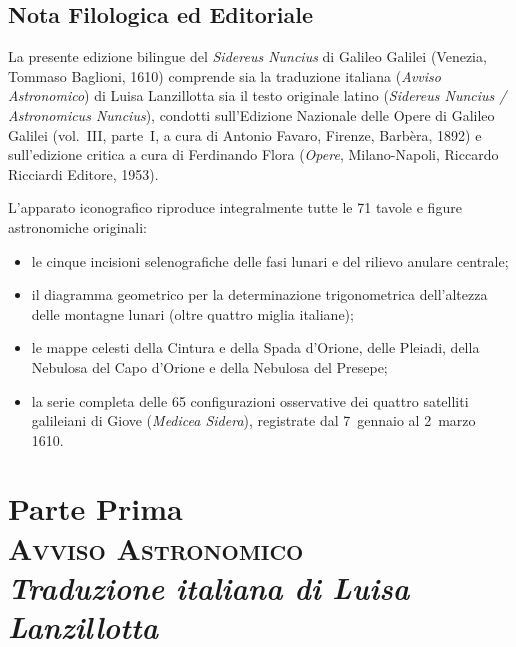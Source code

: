 \documentclass[11pt,twoside,openany]{book}
\begin{document}
\chapter*{Nota Filologica ed Editoriale}
{\small
La presente edizione bilingue del \textit{Sidereus Nuncius} di Galileo Galilei (Venezia, Tommaso Baglioni, 1610) comprende sia la traduzione italiana (\textit{Avviso Astronomico}) di Luisa Lanzillotta sia il testo originale latino (\textit{Sidereus Nuncius / Astronomicus Nuncius}), condotti sull'Edizione Nazionale delle Opere di Galileo Galilei (vol.~III, parte~I, a cura di Antonio Favaro, Firenze, Barbèra, 1892) e sull'edizione critica a cura di Ferdinando Flora (\textit{Opere}, Milano-Napoli, Riccardo Ricciardi Editore, 1953).

L'apparato iconografico riproduce integralmente tutte le 71 tavole e figure astronomiche originali:
\begin{itemize}
\item le cinque incisioni selenografiche delle fasi lunari e del rilievo anulare centrale;
\item il diagramma geometrico per la determinazione trigonometrica dell'altezza delle montagne lunari (oltre quattro miglia italiane);
\item le mappe celesti della Cintura e della Spada d'Orione, delle Pleiadi, della Nebulosa del Capo d'Orione e della Nebulosa del Presepe;
\item la serie completa delle 65 configurazioni osservative dei quattro satelliti galileiani di Giove (\textit{Medicea Sidera}), registrate dal 7~gennaio al 2~marzo 1610.
\end{itemize}
}

\tableofcontents

\mainmatter

\part*{Parte Prima\\{\Large\scshape\color{rubric} Avviso Astronomico}\\{\normalsize\itshape Traduzione italiana di Luisa Lanzillotta}}
\end{document}
